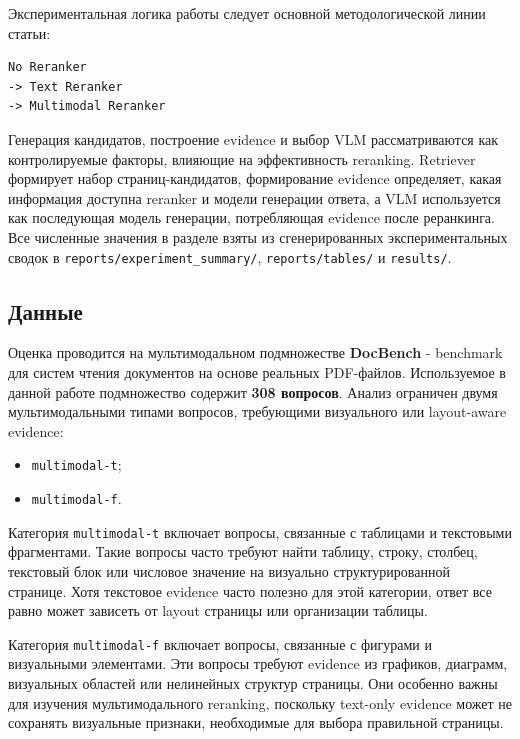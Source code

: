 \documentclass[conference]{IEEEtran}
\begin{document}
Экспериментальная логика работы следует основной методологической линии статьи:

\begin{verbatim}
No Reranker
-> Text Reranker
-> Multimodal Reranker
\end{verbatim}

Генерация кандидатов, построение evidence и выбор VLM рассматриваются как контролируемые факторы, влияющие на эффективность reranking. Retriever формирует набор страниц-кандидатов, формирование evidence определяет, какая информация доступна reranker и модели генерации ответа, а VLM используется как последующая модель генерации, потребляющая evidence после реранкинга. Все численные значения в разделе взяты из сгенерированных экспериментальных сводок в \texttt{reports/experiment\_summary/}, \texttt{reports/tables/} и \texttt{results/}.

\subsection{Данные}

Оценка проводится на мультимодальном подмножестве \textbf{DocBench} - benchmark для систем чтения документов на основе реальных PDF-файлов. Используемое в данной работе подмножество содержит \textbf{308 вопросов}. Анализ ограничен двумя мультимодальными типами вопросов, требующими визуального или layout-aware evidence:

\begin{itemize}
\item \texttt{multimodal-t};
\item \texttt{multimodal-f}.
\end{itemize}

Категория \texttt{multimodal-t} включает вопросы, связанные с таблицами и текстовыми фрагментами. Такие вопросы часто требуют найти таблицу, строку, столбец, текстовый блок или числовое значение на визуально структурированной странице. Хотя текстовое evidence часто полезно для этой категории, ответ все равно может зависеть от layout страницы или организации таблицы.

Категория \texttt{multimodal-f} включает вопросы, связанные с фигурами и визуальными элементами. Эти вопросы требуют evidence из графиков, диаграмм, визуальных областей или нелинейных структур страницы. Они особенно важны для изучения мультимодального reranking, поскольку text-only evidence может не сохранять визуальные признаки, необходимые для выбора правильной страницы.
\end{document}
